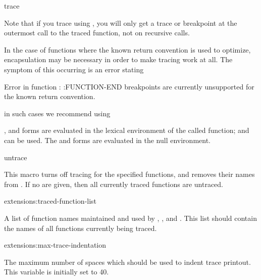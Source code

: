 \begin{defmac}{}{trace}{%
    }
\begin{Lentry}
    Note that if you trace using , you will
    only get a trace or breakpoint at the outermost call to the traced
    function, not on recursive calls.

  \end{Lentry}

  In the case of functions where the known return convention is used
  to optimize, encapsulation may be necessary in order to make
  tracing work at all.  The symptom of this occurring is an error
  stating
  \begin{example}
    Error in function : :FUNCTION-END breakpoints are
    currently unsupported for the known return convention.
  \end{example}
  in such cases we recommend using 
  
  
  ,  and  forms are evaluated in
  the lexical environment of the called function;  and
   can be used.  The  and 
  forms are evaluated in the null environment.
\end{defmac}

\begin{defmac}{}{untrace}{ }
  
  This macro turns off tracing for the specified functions, and
  removes their names from .  If no
   are given, then all currently traced functions
  are untraced.
\end{defmac}

\begin{defvar}{extensions:}{traced-function-list}
  
  A list of function names maintained and used by ,
  , and .  This list should contain
  the names of all functions currently being traced.
\end{defvar}

\begin{defvar}{extensions:}{max-trace-indentation}
  
  The maximum number of spaces which should be used to indent trace
  printout.  This variable is initially set to 40.
\end{defvar}


